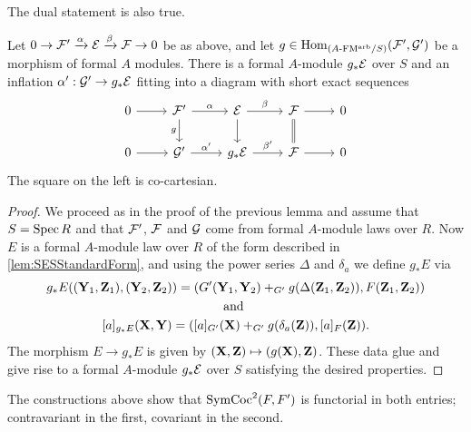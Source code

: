 \documentclass[../main.tex]{subfiles}
\begin{document}
The dual statement is also true. 
\begin{lem}
  Let $0 \to \mathcal{F}' \xrightarrow{\alpha} \mathcal{E} \xrightarrow{\beta} \mathcal{F} \to 0$ be as above, and let
  $g \in \operatorname{Hom}_{{({A}\textnormal-\allowbreak\mathrm{FM^{arb}}/{S})}}(\mathcal{F}', \mathcal{G}')$ be a morphism of formal 
  $A$ modules. There is a formal $A$-module $g_*\mathcal{E}$ over $S$ and an
  inflation $\alpha':\mathcal{G}' \to g_*\mathcal{E}$ fitting into a diagram with short 
  exact sequences
  \begin{equation*}
    \begin{tikzcd}[ampersand replacement=\&]
    	0 \& {\cF'} \& \cE \& \cF \& 0 \\
    	0 \& {\cG'} \& {g_* \cE} \& \cF \& 0
    	\arrow[from=1-1, to=1-2]
    	\arrow["\alpha", from=1-2, to=1-3]
    	\arrow["g"', from=1-2, to=2-2]
    	\arrow["\beta", from=1-3, to=1-4]
    	\arrow[from=1-3, to=2-3]
    	\arrow[from=1-4, to=1-5]
    	\arrow[Rightarrow, no head, from=1-4, to=2-4]
    	\arrow[from=2-1, to=2-2]
    	\arrow["{\alpha'}", from=2-2, to=2-3]
    	\arrow["{\beta'}", from=2-3, to=2-4]
    	\arrow[from=2-4, to=2-5]
    \end{tikzcd}
  \end{equation*}
  The square on the left is co-cartesian.
\begin{proof}
  We proceed as in the proof of the previous lemma and assume that 
  $S = \operatorname{Spec} R$ and that $\mathcal{F}'$, $\mathcal{F}$ and $\mathcal{G}$ come from formal $A$-module
  laws over $R$. Now $E$ is a formal $A$-module law over $R$ of the form 
  described in \cref{lem:SESStandardForm}, and 
  using the power series $\Delta$ and $\delta_a$ we define $g_* E$ via 
  \begin{gather*}
    g_*E((\mathbf{Y}_1, \mathbf{Z}_1), (\mathbf{Y}_2, \mathbf{Z}_2)) = (G'(\mathbf{Y}_1, \mathbf{Y}_2) +_{G'}
    g(\Delta(\mathbf{Z}_1, \mathbf{Z}_2)) , F(\mathbf{Z}_1, \mathbf{Z}_2)) \\
    \text{and } \\
    [a]_{g_*E}(\mathbf{X}, \mathbf{Y}) = ([a]_{G'}(\mathbf{X}) +_{G'} g(\delta_a(\mathbf{Z})), [a]_F(\mathbf{Z})).
  \end{gather*}
  The morphism $E \to g_*E$ is given by $(\mathbf{X}, \mathbf{Z}) \mapsto (g(\mathbf{X}), \mathbf{Z})$. 
  These data glue and give rise to a formal $A$-module
  $g_*\mathcal{E}$ over $S$ satisfying the desired properties.
\end{proof}
\end{lem}

\begin{rmk} 
  The constructions above show that $\operatorname{SymCoc}^2(F, F')$ is functorial in 
  both entries; contravariant in the first, covariant in the second.
\end{rmk}
\end{document}
